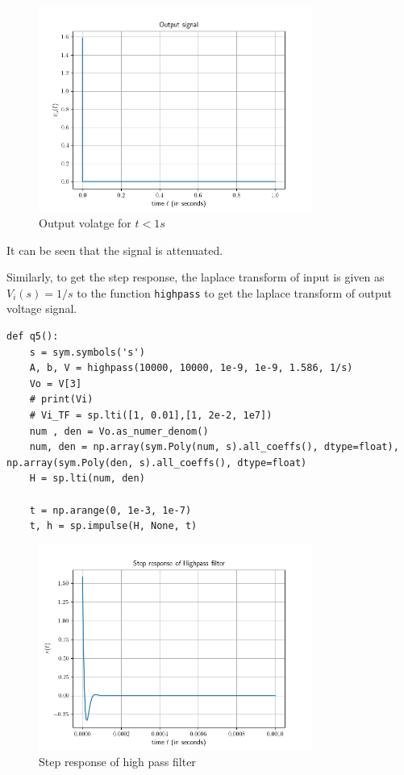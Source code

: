 \documentclass[12pt, a4paper]{article}
\begin{document}
\begin{figure}[H]
\centering
\includegraphics[width=0.8\textwidth]{q4Output4.png}
\caption{Output volatge for $t < 1 s$}
\end{figure}

It can be seen that the signal is attenuated.

Similarly, to get the step response, the laplace transform of input is given as $V_i(s) = 1/s$ to the function \texttt{highpass} to get the laplace transform of output voltage signal.

\begin{lstlisting}
def q5():
    s = sym.symbols('s')
    A, b, V = highpass(10000, 10000, 1e-9, 1e-9, 1.586, 1/s)
    Vo = V[3]
    # print(Vi)
    # Vi_TF = sp.lti([1, 0.01],[1, 2e-2, 1e7])
    num , den = Vo.as_numer_denom()
    num, den = np.array(sym.Poly(num, s).all_coeffs(), dtype=float), np.array(sym.Poly(den, s).all_coeffs(), dtype=float)
    H = sp.lti(num, den)

    t = np.arange(0, 1e-3, 1e-7)
    t, h = sp.impulse(H, None, t)
\end{lstlisting}

\begin{figure}[H]
\centering
\includegraphics[width=0.8\textwidth]{q5.png}
\caption{Step response of high pass filter}
\end{figure}
\end{document}

